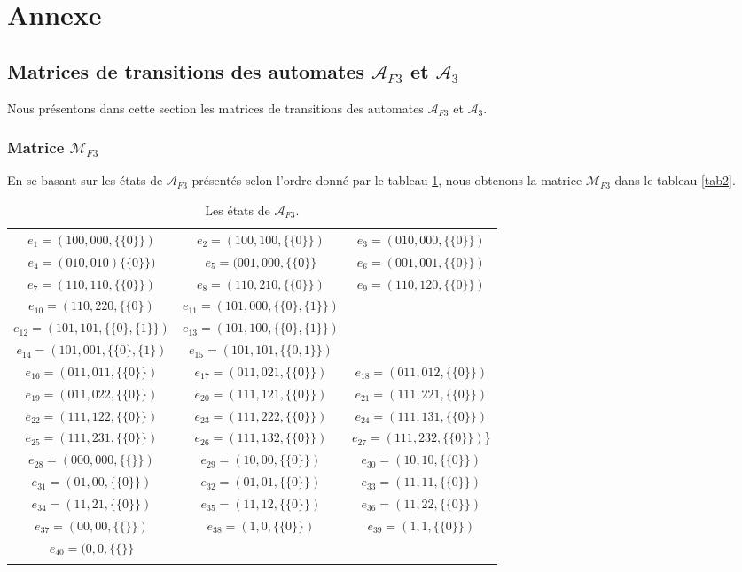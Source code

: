 \documentclass[12pt]{memoireuqam1.3}
\begin{document}
\chapter*{Annexe}
 \begin{spacing}{0.30}
\section*{Matrices de transitions des automates $\mathcal{A}_{F3}$ et $\mathcal{A}_{3}$}
 \end{spacing}
Nous présentons dans cette section les matrices de transitions des automates $\mathcal{A}_{F3}$ et  $\mathcal{A}_{3}$.
\begin{spacing}{0.30} 
\subsection*{Matrice $\mathcal{M}_{F3}$}
 \end{spacing}
En se basant sur les états de $\mathcal{A}_{F3}$ présentés selon l'ordre donné par le tableau \ref{tab1}, nous obtenons la matrice $\mathcal{M}_{F3}$ dans le tableau \ref{tab2}.
\small
\begin{longtable}{|c|c|c|} 
\hline
$e_{1}=(100,000,\{\{0\}\})$&
$e_{2}=(100,100,\{\{0\}\})$&
$e_{3}=(010,000,\{\{0\}\})$\\
$e_{4}=(010,010)\{\{0\}\})$&
$e_{5}=(001,000,\{\{0\}\}$&
$e_{6}=(001,001,\{\{0\}\})$\\
$e_{7}=(110,110,\{\{0\}\})$&
$e_{8}=(110,210,\{\{0\}\})$&
$e_{9}=(110,120,\{\{0\}\})$\\
$e_{10}=(110,220,\{\{0\})$&
$e_{11}=(101,000,\{\{0\},\{1\}\})$& \\
$e_{12}=(101,101,\{\{0\},\{1\}\})$ &
$e_{13}=(101,100,\{\{0\},\{1\}\})$& \\
$e_{14}=(101,001,\{\{0\},\{1\})$&
$e_{15}=(101,101,\{\{0,1\}\})$ &\\
$e_{16}=(011,011,\{\{0\}\})$&
$e_{17}=(011,021,\{\{0\}\})$&
$e_{18}=(011,012,\{\{0\}\})$\\
$e_{19}=(011,022,\{\{0\}\})$&
$e_{20}=(111,121,\{\{0\}\})$&
$e_{21}=(111,221,\{\{0\}\})$\\
$e_{22}=(111,122,\{\{0\}\})$&
$e_{23}=(111,222,\{\{0\}\})$&
$e_{24}=(111,131,\{\{0\}\})$\\
$e_{25}=(111,231,\{\{0\}\})$&
$e_{26}=(111,132,\{\{0\}\})$&
$e_{27}=(111,232,\{\{0\}\})$\}\\
$e_{28}=(000,000,\{\{ \}\})$&
$e_{29}=(10,00,\{\{0\}\})$&
$e_{30}=(10,10,\{\{0\}\})$\\
$e_{31}=(01,00,\{\{0\}\})$&
$e_{32}=(01,01,\{\{0\}\})$&
$e_{33}=(11,11,\{\{0\}\})$\\
$e_{34}=(11,21,\{\{0\}\})$&
$e_{35}=(11,12,\{\{0\}\})$&
$e_{36}=(11,22,\{\{0\}\})$\\
$e_{37}=(00,00,\{\{ \}\})$&
$e_{38}=(1,0,\{\{0\}\})$ & 
$e_{39}=(1,1,\{\{0\}\})$\\
$e_{40}=(0,0,\{\{ \}\}$ & &\\
\hline
\caption{\label{tab1} Les états de $\mathcal{A}_{F3}$.}
\end{longtable}
\end{document}
